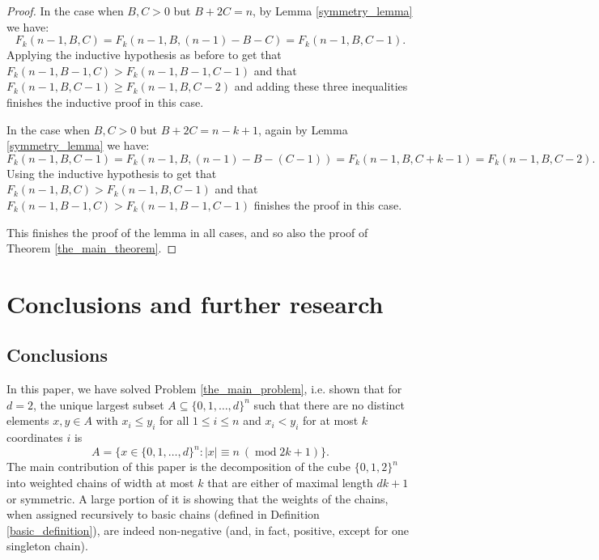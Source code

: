 \documentclass[11pt, reqno]{amsart}
\numberwithin{equation}{section}
\newcommand{\cube}{\{0, 1, 2\}^n}
\newcommand\modd{\operatorname{mod}}
\begin{document}
\begin{proof}
    In the case when $B, C > 0$ but $B+2C=n$, by Lemma \ref{symmetry_lemma} we have:
    \begin{equation}
        F_k(n-1, B, C)=F_k(n-1, B, (n-1)-B-C)=F_k(n-1, B, C-1).
    \end{equation}
    Applying the inductive hypothesis as before to get that $F_k(n-1, B-1, C) > F_k(n-1, B-1, C-1)$ and that $F_k(n-1, B, C-1) \geqslant F_k(n-1, B, C-2)$ and adding these three inequalities finishes the inductive proof in this case.

    In the case when $B, C > 0$ but $B+2C=n-k+1$, again by Lemma \ref{symmetry_lemma} we have:
    \begin{equation}
        F_k(n-1, B, C-1) = F_k(n-1, B, (n-1)-B-(C-1)) = F_k(n-1, B, C+k-1)=F_k(n-1, B, C-2).
    \end{equation}
    Using the inductive hypothesis to get that $F_k(n-1, B, C) > F_k(n-1, B, C-1)$ and that $F_k(n-1, B-1, C) > F_k(n-1, B-1, C-1)$ finishes the proof in this case.

    This finishes the proof of the lemma in all cases, and so also the proof of Theorem \ref{the_main_theorem}.
\end{proof}

\section{Conclusions and further research}

\subsection{Conclusions}

In this paper, we have solved Problem \ref{the_main_problem}, i.e. shown that for $d=2$, the unique largest subset $A \subseteq \{0, 1, \dots, d\}^n$ such that there are no distinct elements $x, y \in A$ with $x_i \leqslant y_i$ for all $1 \leqslant i \leqslant n$ and $x_i < y_i$ for at most $k$ coordinates $i$ is
\begin{equation}
    A = \Big\{ x \in \{0, 1, \dots, d\}^n : |x| \equiv n \ (\modd 2k+1) \Big\}.
\end{equation}
The main contribution of this paper is the decomposition of the cube $\cube$ into weighted chains of width at most $k$ that are either of maximal length $dk+1$ or symmetric. A large portion of it is showing that the weights of the chains, when assigned recursively to basic chains (defined in Definition \ref{basic_definition}), are indeed non-negative (and, in fact, positive, except for one singleton chain).
\end{document}
